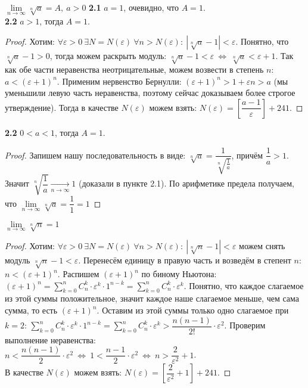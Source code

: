 \documentclass[12pt]{article}
\begin{document}
 $\lim\limits_{n \to \infty} \sqrt[n]{a} = A, \ a > 0$
\textbf{2.1} $a = 1$, очевидно, что $A = 1$. \\
\textbf{2.2} $a > 1$, тогда $A = 1$.
\begin{proof}
    Хотим: $\forall \varepsilon > 0 \ \exists N = N(\varepsilon) \ \forall n > N(\varepsilon) : \ |\sqrt[n]{a} - 1| < \varepsilon$. Понятно, что $\sqrt[n]{a} - 1 > 0$, тогда можем раскрыть модуль: $\sqrt[n]{a} - 1 < \varepsilon \ \Leftrightarrow \ \sqrt[n]{a} < \varepsilon + 1$. Так как обе части неравенства неотрицательные, можем возвести в степень $n$: $a < \left(\varepsilon + 1\right)^n$. Применим нервенство Бернулли: $\left(\varepsilon + 1\right)^n > 1 + \varepsilon n > a$ (мы уменьшили левую часть неравенства, поэтому сейчас доказываем более строгое утверждение). Тогда в качестве $N(\varepsilon)$ можем взять: $N(\varepsilon) = \left[\dfrac{a - 1}{\varepsilon}\right] + 241$. 
\end{proof}
\textbf{2.2} $0 < a < 1$, тогда $A = 1$. 
\begin{proof}
    Запишем нашу последовательность в виде: $\sqrt[n]{a} = \dfrac{1}{\sqrt[n]{\frac1a}}$, причём $\dfrac1a > 1$. Значит $\sqrt[n]{\dfrac1a}\xrightarrow[n \to \infty]{} 1$ (доказали в пункте 2.1). По арифметике предела получаем, что $\lim\limits_{n \to \infty} \sqrt[n]{a} = \dfrac11 = 1$
\end{proof}

 $\lim\limits_{n \to \infty} \sqrt[n]{n} = 1$
\begin{proof}
    Хотим: $\forall \varepsilon > 0 \ \exists N = N(\varepsilon) \ \forall n > N(\varepsilon): \ |\sqrt[n]{n} - 1| < \varepsilon$ можем снять модуль $\sqrt[n]{n} - 1 < \varepsilon$. Перенесём единицу в правую часть и возведём в степент $n$: $n < (\varepsilon + 1)^n$. Распишем $(\varepsilon + 1)^n$ по биному Ньютона: $(\varepsilon + 1)^n = \sum\limits_{k = 0}^{n}C_n^k\cdot\varepsilon^k\cdot1^{n-k} = \sum\limits_{k = 0}^{n}C_n^k\cdot\varepsilon^k$. Понятно, что каждое слагаемое из этой суммы положительное, значит каждое наше слагаемое меньше, чем сама сумма, то есть $(\varepsilon + 1)^n$. Оставим из этой суммы только одно слагаемое при $k = 2$: $\sum\limits_{k = 0}^{n}C_n^k\cdot\varepsilon^k\cdot1^{n-k} = \sum\limits_{k = 0}^{n}C_n^k\cdot\varepsilon^k > \dfrac{n(n-1)}{2!}\cdot \varepsilon^2$. Проверим выполнение неравенства: \\
    $n < \dfrac{n(n-1)}{2}\cdot \varepsilon^2 \ \Leftrightarrow \ 1 < \dfrac{n - 1}{2}\cdot\varepsilon^2 \ \Leftrightarrow \ n > \dfrac{2}{\varepsilon^2} + 1$.\\ В качестве $N(\varepsilon)$ можем взять: $N(\varepsilon) = \left[\dfrac{2}{\varepsilon^2} + 1\right] + 241$.
\end{proof}
\end{document}
